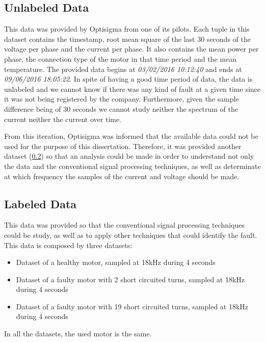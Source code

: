 \subsection{Unlabeled Data}
\label{subsec:data_category_1}

This data was provided by Optisigma from one of its pilots. Each tuple in this dataset contains the timestamp, root mean square of the last 30 seconds of the voltage per phase and the  current per phase. It also contains the mean power per phase, the connection type of the motor in that time period and the mean temperature.
The provided data begins at \emph{03/02/2016  10:12:40} and ends at \emph{09/06/2016  18:05:22}.
In spite of having a good time period of data, the data is unlabeled and we cannot know if there was any kind of fault at a given time since it was not being registered by the company.
Furthermore, given the sample difference being of 30 seconds we cannot study neither the spectrum of the current neither the current over time.

From this iteration, Optisigma was informed that the available data could not be used for the purpose of this dissertation.
Therefore, it was provided another dataset (\ref{subsec:data_category_2}) so that an analysis could be made in order to understand not only the data and the conventional signal processing techniques, as well as determinate at which frequency the samples of the current and voltage should be made.

\subsection{Labeled Data}
\label{subsec:data_category_2}

This data was provided so that the conventional signal processing techniques could be study, as well as to apply other techniques that could identify the fault. This data is composed by three datasets:

\begin{itemize}
  \item 
  Dataset of a healthy motor, sampled at 18kHz during 4 seconds
  \item 
  Dataset of a faulty motor with 2 short circuited turns, sampled at 18kHz during 4 seconds
  \item 
  Dataset of a faulty motor with 19 short circuited turns, sampled at 18kHz during 4 seconds
\end{itemize}

In all the datasets, the used motor is the same.

